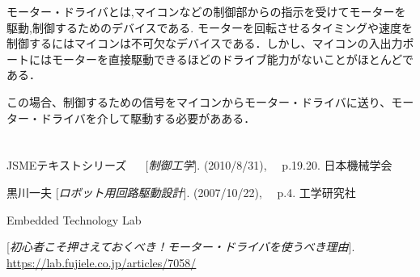 \documentclass[xelatex,ja=standard,jafont=noto]{bxjsarticle}
\begin{document}
モーター・ドライバとは,マイコンなどの制御部からの指示を受けてモーターを駆動,制御するためのデバイスである.
モーターを回転させるタイミングや速度を制御するにはマイコンは不可欠なデバイスである．しかし、マイコンの入出力ポートにはモーターを直接駆動できるほどのドライブ能力がないことがほとんどである．

この場合、制御するための信号をマイコンからモーター・ドライバに送り、モーター・ドライバを介して駆動する必要があある．


\newpage


\section{}
\begin{thebibliography}{9}
JSMEテキストシリーズ 　
[\textit{制御工学}]. 
 (2010/8/31),  　p.19.20. 日本機械学会

黒川一夫 
[\textit{ロボット用回路駆動設計}]. 
(2007/10/22),  　p.4. 工学研究社


Embedded Technology Lab

[\textit{初心者こそ押さえておくべき！モーター・ドライバを使うべき理由}]. 
\url{https://lab.fujiele.co.jp/articles/7058/}



\end{thebibliography}
\end{document}
